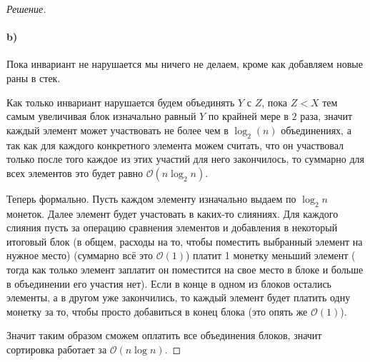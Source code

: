 \documentclass[12pt]{article}
\newenvironment{solution}{\begin{proof}[Решение]}{\end{proof}}
\begin{document}
\begin{solution}
	\paragraph{b)}

	Пока инвариант не нарушается мы ничего не делаем, кроме как 
	добавляем новые раны в стек.

	Как только инвариант нарушается будем объединять $Y$ с $Z$, пока
	$Z < X$ тем самым увеличивая блок изначально равный $Y$
	по крайней мере в $2$ раза, значит каждый элемент может участвовать 
	не более чем в $\log_2 (n)$ объединениях, а так как для каждого
	конкретного элемента можем считать, что он участвовал только после
	того каждое из этих участий для него закончилось, то суммарно для 
	всех элементов это будет равно $\mathcal{O}(n \log_2{n})$.
	
	Теперь формально. Пусть каждом элементу изначально выдаем по 
	$\log_2 {n}$ монеток. Далее элемент будет участовать в каких-то
	слияниях. Для каждого слияния пусть за операцию сравнения элементов
	и добавления в некоторый итоговый блок (в общем, расходы на то,
	чтобы поместить выбранный элемент на нужное место) (суммарно всё это
	$\mathcal{O}(1)$) платит 1 монетку меньший элемент (
	тогда как только элемент заплатит он поместится на свое место 
	в блоке и больше в объединении его участия нет). 
	Если в конце в одном из блоков остались элементы,
	а в другом уже закончились, то каждый элемент будет платить одну 
	монетку за то, чтобы просто добавиться в конец блока (это опять же
	$\mathcal{O}(1)$). 
	
	Значит таким образом сможем оплатить все объединения блоков,
	значит сортировка работает за $\mathcal{O}(n \log{n})$.

\end{solution}
\end{document}
